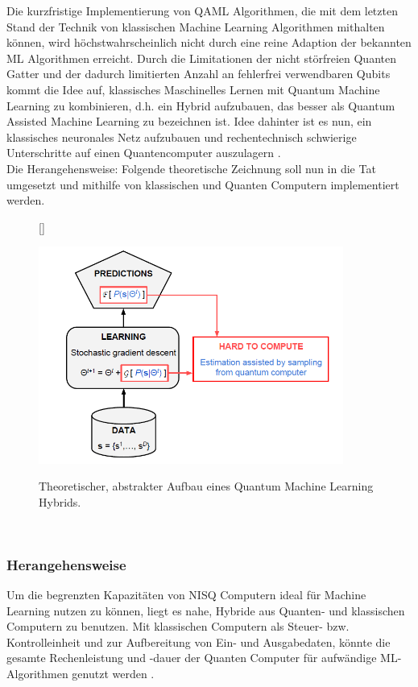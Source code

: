 Die kurzfristige Implementierung von QAML Algorithmen, die mit dem letzten Stand der Technik von klassischen Machine Learning Algorithmen mithalten können, wird höchstwahrscheinlich nicht durch eine reine Adaption der bekannten ML Algorithmen erreicht. Durch die Limitationen der nicht störfreien Quanten Gatter und der dadurch limitierten Anzahl an fehlerfrei verwendbaren Qubits kommt die Idee auf, klassisches Maschinelles Lernen mit Quantum Machine Learning zu kombinieren, d.h. ein Hybrid aufzubauen, das besser als Quantum Assisted Machine Learning zu bezeichnen ist. Idee dahinter ist es nun, ein klassisches neuronales Netz aufzubauen und rechentechnisch schwierige Unterschritte auf einen Quantencomputer auszulagern \cite{opportunitieschallenges1}. \\
Die Herangehensweise: Folgende theoretische Zeichnung soll nun in die Tat umgesetzt und mithilfe von klassischen und Quanten Computern implementiert werden.\\


\begin{figure}[h]
[\FBwidth]
{\caption{Theoretischer, abstrakter Aufbau eines Quantum Machine Learning Hybrids. \cite{opportunitieschallenges1}}\label{fig:test}}
{\includegraphics[width=10cm]{QML/images/3-2-1.PNG}}
\end{figure}\\


\subsubsection{Herangehensweise}

Um die begrenzten Kapazitäten von NISQ Computern ideal für Machine Learning nutzen zu können, liegt es nahe, Hybride aus Quanten- und klassischen Computern zu benutzen. Mit klassischen Computern als Steuer- bzw. Kontrolleinheit und zur Aufbereitung von Ein- und Ausgabedaten, könnte die gesamte Rechenleistung und -dauer der Quanten Computer für aufwändige ML-Algorithmen genutzt werden \cite{wittek2014quantum}.\\


